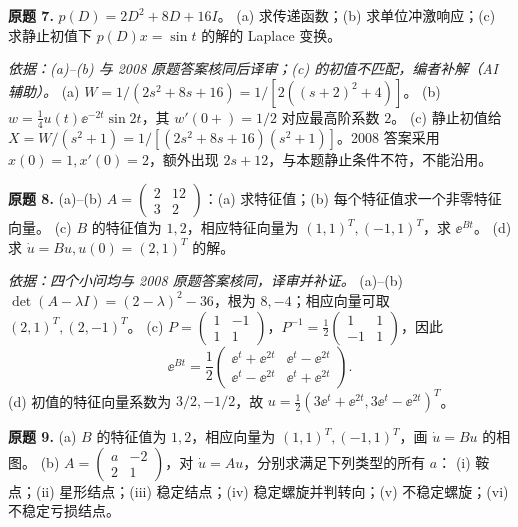 \begin{exercise}\label{cw:prfinal-7}\textbf{原题 7.} $p(D)=2D^2+8D+16I$。
(a) 求传递函数；(b) 求单位冲激响应；(c) 求静止初值下 $p(D)x=\sin t$ 的解的 Laplace 变换。
\end{exercise}
\begin{solution}
\textit{依据：(a)--(b) 与 2008 原题答案核同后译审；(c) 的初值不匹配，编者补解（AI 辅助）。}
(a) $W=1/(2s^2+8s+16)=1/[2((s+2)^2+4)]$。
(b) $w=\tfrac14u(t)\ee^{-2t}\sin2t$，其 $w'(0+)=1/2$ 对应最高阶系数 $2$。
(c) 静止初值给 $X=W/(s^2+1)=1/[(2s^2+8s+16)(s^2+1)]$。2008 答案采用 $x(0)=1,x'(0)=2$，额外出现 $2s+12$，与本题静止条件不符，不能沿用。
\end{solution}
\begin{exercise}\label{cw:prfinal-8}\textbf{原题 8.}
(a)--(b) $A=\begin{pmatrix}2&12\\3&2\end{pmatrix}$：(a) 求特征值；(b) 每个特征值求一个非零特征向量。
(c) $B$ 的特征值为 $1,2$，相应特征向量为 $(1,1)^T,(-1,1)^T$，求 $\ee^{Bt}$。
(d) 求 $\dot u=Bu,u(0)=(2,1)^T$ 的解。
\end{exercise}
\begin{solution}
\textit{依据：四个小问均与 2008 原题答案核同，译审并补证。}
(a)--(b) $\det(A-\lambda I)=(2-\lambda)^2-36$，根为 $8,-4$；相应向量可取 $(2,1)^T,(2,-1)^T$。
(c) $P=\begin{pmatrix}1&-1\\1&1\end{pmatrix}$，$P^{-1}=\tfrac12\begin{pmatrix}1&1\\-1&1\end{pmatrix}$，因此
\[\ee^{Bt}=\frac12\begin{pmatrix}\ee^t+\ee^{2t}&\ee^t-\ee^{2t}\\\ee^t-\ee^{2t}&\ee^t+\ee^{2t}\end{pmatrix}.\]
(d) 初值的特征向量系数为 $3/2,-1/2$，故 $u=\tfrac12(3\ee^t+\ee^{2t},3\ee^t-\ee^{2t})^T$。
\end{solution}
\begin{exercise}\label{cw:prfinal-9}\textbf{原题 9.}
(a) $B$ 的特征值为 $1,2$，相应向量为 $(1,1)^T,(-1,1)^T$，画 $\dot u=Bu$ 的相图。
(b) $A=\begin{pmatrix}a&-2\\2&1\end{pmatrix}$，对 $\dot u=Au$，分别求满足下列类型的所有 $a$：
(i) 鞍点；(ii) 星形结点；(iii) 稳定结点；(iv) 稳定螺旋并判转向；(v) 不稳定螺旋；(vi) 不稳定亏损结点。
\end{exercise}

